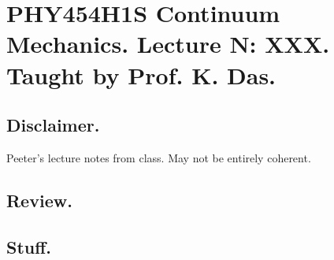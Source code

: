 
%

\chapter{PHY454H1S Continuum Mechanics.  Lecture {N}: XXX.  Taught by Prof. K. Das.}
\label{chap:continuumL{N}}
{}
\date{Mar XX, 2012}

\beginArtWithToc

\section{Disclaimer.}

Peeter's lecture notes from class.  May not be entirely coherent.

\section{Review.}

\section{Stuff.}


\EndArticle
